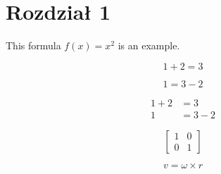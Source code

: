 \documentclass{article}
\begin{document}
  \section{Rozdział 1}

  This formula $f(x) = x^2$ is an example.

  \begin{equation}
    1 + 2 = 3
  \end{equation}

  \begin{equation}
    1 = 3 - 2
  \end{equation}

  \begin{align}
    1 + 2 &= 3\\
    1 &= 3 - 2
  \end{align}

  \begin{equation}
    \left[
    \begin{matrix}
    1 & 0\\
    0 & 1
    \end{matrix}
    \right]
  \end{equation}

  \begin{equation}
    v = \omega \times r
  \end{equation}
\end{document}
